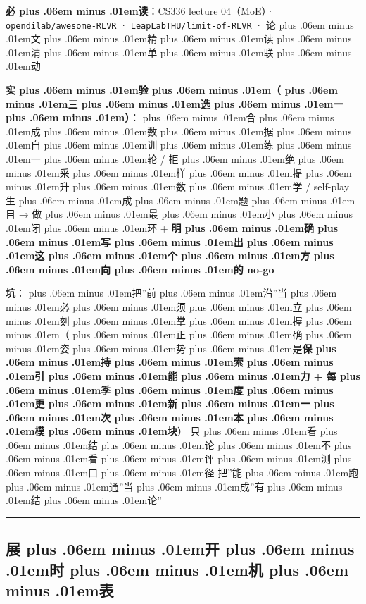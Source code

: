 \documentclass[
]{article}
\newcommand{\passthrough}[1]{#1}
\def\zh#1{{\zhfont #1}}
\def\sym#1{{\symfont #1}}
\def\zhglue{\hskip0pt plus .06em minus .01em}
\begin{document}
\textbf{\zh{必\zhglue 读}}\zh{：}CS336 lecture 04\zh{（}MoE\zh{）}\sym{·} \passthrough{\lstinline!opendilab/awesome-RLVR!} \sym{·} \passthrough{\lstinline!LeapLabTHU/limit-of-RLVR!} \sym{·} \zh{论\zhglue 文\zhglue 精\zhglue 读\zhglue 清\zhglue 单\zhglue 联\zhglue 动}

\textbf{\zh{实\zhglue 验\zhglue （\zhglue 三\zhglue 选\zhglue 一\zhglue ）}}\zh{：\zhglue 合\zhglue 成\zhglue 数\zhglue 据\zhglue 自\zhglue 训\zhglue 练\zhglue 一\zhglue 轮} / \zh{拒\zhglue 绝\zhglue 采\zhglue 样\zhglue 提\zhglue 升\zhglue 数\zhglue 学} / self-play \zh{生\zhglue 成\zhglue 题\zhglue 目} \sym{→} \zh{做\zhglue 最\zhglue 小\zhglue 闭\zhglue 环} + \textbf{\zh{明\zhglue 确\zhglue 写\zhglue 出\zhglue 这\zhglue 个\zhglue 方\zhglue 向\zhglue 的} no-go}

\textbf{\zh{坑}}\zh{：\zhglue 把}''\zh{前\zhglue 沿}''\zh{当\zhglue 必\zhglue 须\zhglue 立\zhglue 刻\zhglue 掌\zhglue 握\zhglue （\zhglue 正\zhglue 确\zhglue 姿\zhglue 势\zhglue 是}\textbf{\zh{保\zhglue 持\zhglue 索\zhglue 引\zhglue 能\zhglue 力} + \zh{每\zhglue 季\zhglue 度\zhglue 更\zhglue 新\zhglue 一\zhglue 次\zhglue 本\zhglue 模\zhglue 块}}\zh{）}\textbar{} \zh{只\zhglue 看\zhglue 结\zhglue 论\zhglue 不\zhglue 看\zhglue 评\zhglue 测\zhglue 口\zhglue 径} \textbar{} \zh{把}''\zh{能\zhglue 跑\zhglue 通}''\zh{当\zhglue 成}''\zh{有\zhglue 结\zhglue 论}''

\begin{center}\rule{0.5\linewidth}{0.5pt}\end{center}

\subsection{\zh{展\zhglue 开\zhglue 时\zhglue 机\zhglue 表}}\label{ux5c55ux5f00ux65f6ux673aux8868}
\end{document}
